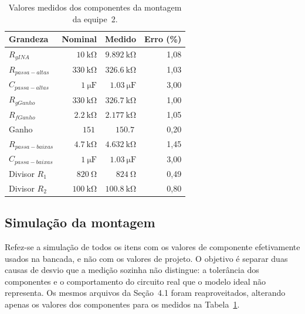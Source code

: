 \documentclass[11pt,a4paper]{article}
\begin{document}
\begin{table}
\centering
\caption{Valores medidos dos componentes da montagem da equipe~2.}
\label{tab:componentes_bancada}
  \begin{tabular}{@{}lrrr@{}}
    \toprule
    \textbf{Grandeza} & \textbf{Nominal} & \textbf{Medido} & \textbf{Erro (\%)} \\
    \midrule
    $R_{gINA}$         & $\SI{10}{\kilo\ohm}$   & $\SI{9,892}{\kilo\ohm}$   & 1,08 \\

    $R_{passa-altas}$  & $\SI{330}{\kilo\ohm}$  & $\SI{326,6}{\kilo\ohm}$   & 1,03 \\
    $C_{passa-altas}$  & $\SI{1}{\micro\farad}$ & $\SI{1,03}{\micro\farad}$ & 3,00 \\

    $R_{gGanho}$       & $\SI{330}{\kilo\ohm}$  & $\SI{326,7}{\kilo\ohm}$   & 1,00 \\
    $R_{fGanho}$       & $\SI{2,2}{\kilo\ohm}$  & $\SI{2,177}{\kilo\ohm}$   & 1,05 \\

    Ganho              & $\SI{151}{}$           & $\SI{150,7}{}$            & 0,20 \\

    $R_{passa-baixas}$ & $\SI{4,7}{\kilo\ohm}$  & $\SI{4,632}{\kilo\ohm}$   & 1,45 \\
    $C_{passa-baixas}$ & $\SI{1}{\micro\farad}$ & $\SI{1,03}{\micro\farad}$ & 3,00 \\

    Divisor $R_1$      & $\SI{820}{\ohm}$       & $\SI{824}{\ohm}$          & 0,49 \\
    Divisor $R_2$      & $\SI{100}{\kilo\ohm}$  & $\SI{100,8}{\kilo\ohm}$   & 0,80 \\
    \bottomrule
  \end{tabular}
\end{table}

\subsection{Simulação da montagem}

Refez-se a simulação de todos os itens com os valores de componente efetivamente usados na bancada, e não com os valores de projeto. O objetivo é separar duas causas de desvio que a medição sozinha não distingue: a tolerância dos componentes e o comportamento do circuito real que o modelo ideal não representa. Os mesmos arquivos da Seção~4.1 foram reaproveitados, alterando apenas os valores dos componentes para os medidos na Tabela~\ref{tab:componentes_bancada}.
\end{document}
